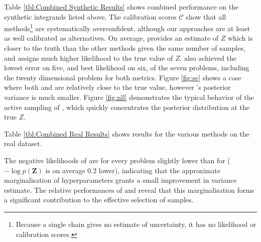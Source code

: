 \documentclass{article} %
\begin{document}
\begin{table}[h!]
\begin{minipage}[b]{0.5\linewidth}\centering

\end{minipage}
\begin{minipage}[b]{0.5\linewidth}\centering

\end{minipage}
%
\end{table}

Table \ref{tbl:Combined Synthetic Results} shows combined performance on the synthetic integrands listed above. The calibration scores $\mathcal{C}$ show that all methods\footnote{Because a single  chain gives no estimate of uncertainty, it has no likelihood or calibration scores.} are systematically overconfident, although our approaches are at least as well calibrated as alternatives. On average,  provides an estimate of $Z$ which is closer to the truth than the other methods given the same number of samples, and assigns much higher likelihood to the true value of $Z$.  also achieved the lowest error on five, and best likelihood on six, of the seven problems, including the twenty dimensional problem for both metrics.  Figure \ref{fig:se} shows a case where both
  and  are relatively close to the true value, however 's posterior variance is much smaller.  Figure \ref{fig:nll} demonstrates the typical behavior of the active sampling of , which quickly concentrates the posterior distribution at the true $Z$. 

Table \ref{tbl:Combined Real Results} shows results for the various methods on the real dataset.  

The negative likelihoods of  are for every problem slightly lower than for  ($-\log p(\mathbf{Z})$ is on average $0.2$ lower), indicating that the approximate marginalisation of hyperparameters grants a small improvement in variance estimate. The relative performances of  and  reveal that this marginalisation forms a significant contribution to the effective selection of samples. 
\end{document}

